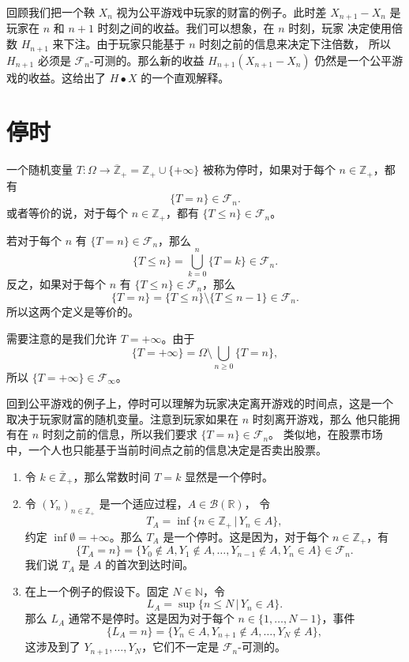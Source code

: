 \documentclass[fontset=none]{Notes}
\begin{document}
回顾我们把一个鞅 $X_n$ 视为公平游戏中玩家的财富的例子。此时差 $X_{n+1}-X_n$
是玩家在 $n$ 和 $n+1$ 时刻之间的收益。我们可以想象，在 $n$ 时刻，玩家
决定使用倍数 $H_{n+1}$ 来下注。由于玩家只能基于 $n$ 时刻之前的信息来决定下注倍数，
所以 $H_{n+1}$ 必须是 $\mathcal{F}_n$-可测的。那么新的收益 $H_{n+1}(X_{n+1}-X_n)$
仍然是一个公平游戏的收益。这给出了 $H\bullet X$ 的一个直观解释。


\section{停时}

\begin{definition}
  一个随机变量 $T:\Omega\to \overline{\mathbb{Z}}_+=\mathbb{Z}_+\cup \{+\infty\}$
  被称为停时，如果对于每个 $n\in \mathbb{Z}_+$，都有
  \[
    \{T=n\}\in \mathcal{F}_n.
  \]
  或者等价的说，对于每个 $n\in \mathbb{Z}_+$，都有 $\{T\leq n\}\in \mathcal{F}_n$。
\end{definition}

若对于每个 $n$ 有 $\{T=n\}\in \mathcal{F}_n$，那么
\[
  \{T\leq n\}=\bigcup_{k=0}^n\{T=k\}\in \mathcal{F}_n.
\]
反之，如果对于每个 $n$ 有 $\{T\leq n\}\in \mathcal{F}_n$，那么
\[
  \{T=n\}=\{T\leq n\}\setminus \{T\leq n-1\}\in \mathcal{F}_n.
\] 
所以这两个定义是等价的。

需要注意的是我们允许 $T=+\infty$。由于
\[
  \{T=+\infty\}=\Omega\setminus \bigcup_{n\geq 0} \{T=n\},
\]
所以 $\{T=+\infty\}\in \mathcal{F}_\infty$。

回到公平游戏的例子上，停时可以理解为玩家决定离开游戏的时间点，这是一个
取决于玩家财富的随机变量。注意到玩家如果在 $n$ 时刻离开游戏，那么
他只能拥有在 $n$ 时刻之前的信息，所以我们要求 $\{T=n\}\in \mathcal{F}_n$。
类似地，在股票市场中，一个人也只能基于当前时间点之前的信息决定是否卖出股票。

\begin{example}
  \mbox{}
  \begin{enumerate}
    \item 令 $k\in \overline{ \mathbb{Z}}_+$，那么常数时间 $T=k$
    显然是一个停时。
    \item 令 $(Y_n)_{n\in \mathbb{Z}_+}$ 是一个适应过程，$A\in \mathcal{B}(\mathbb{R})$，
    令
    \[
      T_A=\inf \{n\in \mathbb{Z}_+\,|\, Y_n\in A\},
    \]
    约定 $\inf \emptyset=+\infty$。那么 $T_A$ 是一个停时。这是因为，对于每个
    $n\in \mathbb{Z}_+$，有
    \[
      \{T_A=n\}=\{Y_0\notin A,Y_1\notin A,\dots,Y_{n-1}\notin A,Y_n\in A\}
      \in \mathcal{F}_n.
    \]
    我们说 $T_A$ 是 $A$ 的首次到达时间。
    \item 在上一个例子的假设下。固定 $N\in \mathbb{N}$，令 
    \[
      L_A=\sup\{n\leq N\,|\, Y_n\in A\}.
    \]
    那么 $L_A$ 通常不是停时。这是因为对于每个 $n\in\{1,\dots,N-1\}$，事件
    \[
      \{L_A=n\}=\{Y_n\in A,Y_{n+1}\notin A,\dots, Y_N\notin A\},
    \]
    这涉及到了 $Y_{n+1},\dots,Y_N$，它们不一定是 $\mathcal{F}_n$-可测的。
  \end{enumerate}
\end{example}
\end{document}
